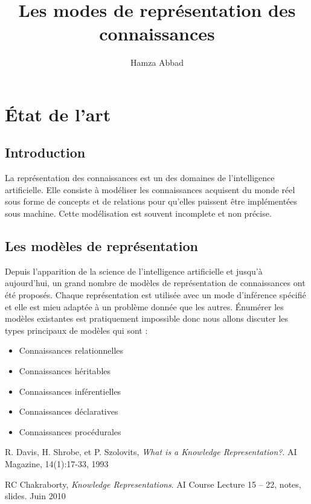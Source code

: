 \documentclass[12pt,a4paper]{report}
\author{Hamza Abbad}
\title{Les modes de représentation des connaissances}
\begin{document}
\maketitle
\chapter{\'Etat de l'art}
\section{Introduction}
La représentation des connaissances est un des domaines de l'intelligence artificielle. Elle consiste à modéliser
les connaissances acquisent du monde réel sous forme de concepts et de relations pour qu'elles puissent être
implémentées sous machine. Cette modélisation est souvent incomplete et non précise.\cite{WKR}

\section{Les modèles de représentation}
Depuis l'apparition de la science de l'intelligence artificielle et jusqu'à aujourd'hui, un grand nombre de modèles
de représentation de connaissances ont été proposés. Chaque représentation est utilisée avec un mode d'inférence spécifié
et elle est mieu adaptée à un problème donnée que les autres. \'Enumérer les modèles existantes est pratiquement impossible
donc nous allons discuter les types principaux de modèles qui sont :
\begin{itemize}
\item Connaissances relationnelles
\item Connaissances héritables
\item Connaissances inférentielles
\item Connaissances déclaratives
\item Connaissances procédurales
\end{itemize}
\cite{KRC}

\begin{thebibliography}{9}
R. Davis, H. Shrobe, et P. Szolovits,
\emph{What is a Knowledge Representation?}.
AI Magazine, 14(1):17-33, 1993

RC Chakraborty,
\emph{Knowledge Representations}.
AI Course Lecture 15 – 22, notes, slides. Juin 2010 
\end{thebibliography}
\end{document}
